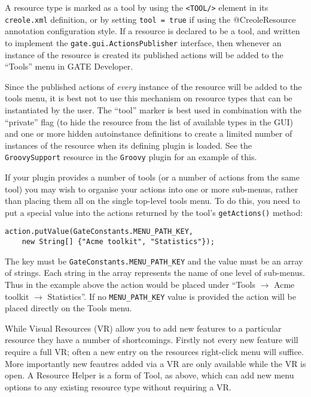 A resource type is marked as a tool by using the \verb|<TOOL/>| element in its
\verb|creole.xml| definition, or by setting \verb|tool = true| if using the
@CreoleResource annotation configuration style.  If a resource is declared to
be a tool, and written to implement the \verb|gate.gui.ActionsPublisher|
interface, then whenever an instance of the resource is created its published
actions will be added to the ``Tools'' menu in GATE Developer.

Since the published actions of {\em every} instance of the resource will be
added to the tools menu, it is best not to use this mechanism on resource types
that can be instantiated by the user.  The ``tool'' marker is best used in
combination with the ``private'' flag (to hide the resource from the list of
available types in the GUI) and one or more hidden autoinstance definitions
to create a limited number of instances of the resource when its defining
plugin is loaded.  See the \verb|GroovySupport| resource in the \verb|Groovy|
plugin for an example of this.


If your plugin provides a number of tools (or a number of actions from the same
tool) you may wish to organise your actions into one or more sub-menus, rather
than placing them all on the single top-level tools menu.  To do this, you need
to put a special value into the actions returned by the tool's
\lstinline!getActions()! method:
\begin{lstlisting}
action.putValue(GateConstants.MENU_PATH_KEY,
    new String[] {"Acme toolkit", "Statistics"});
\end{lstlisting}
The key must be \lstinline!GateConstants.MENU_PATH_KEY! and the value must be
an array of strings.  Each string in the array represents the name of one level
of sub-menus.  Thus in the example above the action would be placed under
``Tools $\rightarrow$ Acme toolkit $\rightarrow$ Statistics''.  If no
\lstinline!MENU_PATH_KEY! value is provided the action will be placed directly
on the Tools menu.


While Visual Resources (VR) allow you to add new features to a particular
resource they have a number of shortcomings. Firstly not every new feature
will require a full VR; often a new entry on the resources right-click
menu will suffice. More importantly new feautres added via a VR are only
available while the VR is open. A Resource Helper is a form of Tool, as
above, which can add new menu options to any existing resource type without
requiring a VR.

